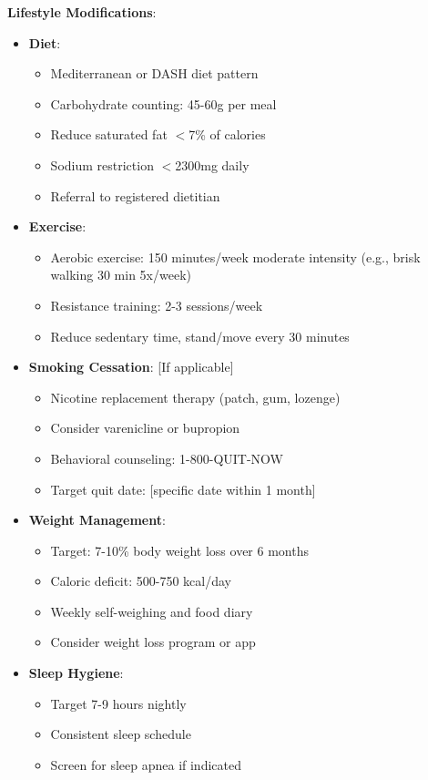 \documentclass[11pt,letterpaper]{article}
\begin{document}
\textbf{Lifestyle Modifications}:
\begin{itemize}[leftmargin=*]
    \item \textbf{Diet}:
    \begin{itemize}
        \item Mediterranean or DASH diet pattern
        \item Carbohydrate counting: 45-60g per meal
        \item Reduce saturated fat $<$7\% of calories
        \item Sodium restriction $<$2300mg daily
        \item Referral to registered dietitian
    \end{itemize}

    \item \textbf{Exercise}:
    \begin{itemize}
        \item Aerobic exercise: 150 minutes/week moderate intensity (e.g., brisk walking 30 min 5x/week)
        \item Resistance training: 2-3 sessions/week
        \item Reduce sedentary time, stand/move every 30 minutes
    \end{itemize}

    \item \textbf{Smoking Cessation}: [If applicable]
    \begin{itemize}
        \item Nicotine replacement therapy (patch, gum, lozenge)
        \item Consider varenicline or bupropion
        \item Behavioral counseling: 1-800-QUIT-NOW
        \item Target quit date: [specific date within 1 month]
    \end{itemize}

    \item \textbf{Weight Management}:
    \begin{itemize}
        \item Target: 7-10\% body weight loss over 6 months
        \item Caloric deficit: 500-750 kcal/day
        \item Weekly self-weighing and food diary
        \item Consider weight loss program or app
    \end{itemize}

    \item \textbf{Sleep Hygiene}:
    \begin{itemize}
        \item Target 7-9 hours nightly
        \item Consistent sleep schedule
        \item Screen for sleep apnea if indicated
    \end{itemize}


\end{itemize}
\end{document}
